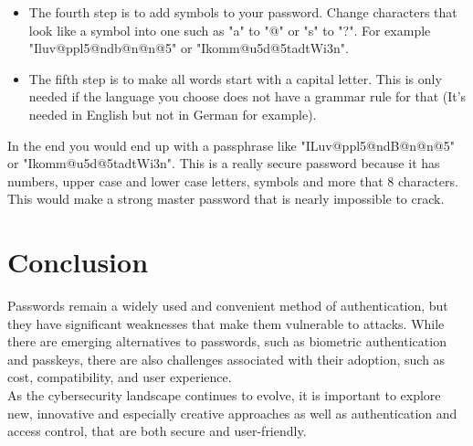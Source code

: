 \documentclass[conference]{IEEEtran}
\begin{document}
\begin{enumerate}
\begin{itemize}
\item The fourth step is to add symbols to your password. Change characters that look like a symbol into one such as "a" to "@" or "s" to "?". For example "Iluv@ppl5@ndb@n@n@5" or "Ikomm@u5d@5tadtWi3n".
\item The fifth step is to make all words start with a capital letter. This is only needed if the language you choose does not have a grammar rule for that (It's needed in English but not in German for example). 
\end{itemize}
In the end you would end up with a passphrase like "ILuv@ppl5@ndB@n@n@5" or "Ikomm@u5d@5tadtWi3n". This is a really secure password because it has numbers, upper case and lower case letters, symbols and more that 8 characters. This would make a strong master password that is nearly impossible to crack.
\end{enumerate}


\section{Conclusion}
Passwords remain a widely used and convenient method of authentication, but they have significant weaknesses that make them vulnerable to attacks. While there are emerging alternatives to passwords, such as biometric authentication and passkeys, there are also challenges associated with their adoption, such as cost, compatibility, and user experience.\\
As the cybersecurity landscape continues to evolve, it is important to explore new, innovative and especially creative approaches as well as authentication and access control, that are both secure and user-friendly.


\listoffigures
\end{document}
